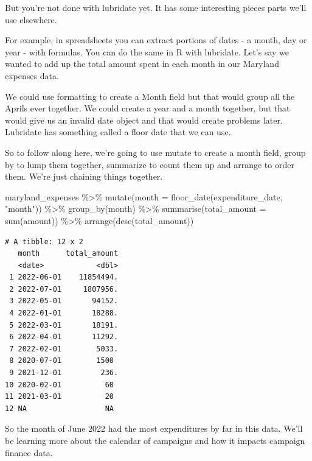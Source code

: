 \documentclass[
  letterpaper,
  DIV=11,
  numbers=noendperiod]{scrreprt}
\newenvironment{Shaded}{\begin{snugshade}}{\end{snugshade}}
\newcommand{\AttributeTok}[1]{\textcolor[rgb]{0.40,0.45,0.13}{#1}}
\newcommand{\FunctionTok}[1]{\textcolor[rgb]{0.28,0.35,0.67}{#1}}
\newcommand{\NormalTok}[1]{\textcolor[rgb]{0.00,0.23,0.31}{#1}}
\newcommand{\SpecialCharTok}[1]{\textcolor[rgb]{0.37,0.37,0.37}{#1}}
\newcommand{\StringTok}[1]{\textcolor[rgb]{0.13,0.47,0.30}{#1}}
\begin{document}
But you're not done with lubridate yet. It has some interesting pieces
parts we'll use elsewhere.

For example, in spreadsheets you can extract portions of dates - a
month, day or year - with formulas. You can do the same in R with
lubridate. Let's say we wanted to add up the total amount spent in each
month in our Maryland expenses data.

We could use formatting to create a Month field but that would group all
the Aprils ever together. We could create a year and a month together,
but that would give us an invalid date object and that would create
problems later. Lubridate has something called a floor date that we can
use.

So to follow along here, we're going to use mutate to create a month
field, group by to lump them together, summarize to count them up and
arrange to order them. We're just chaining things together.

\begin{Shaded}
\begin{Highlighting}[]
\NormalTok{maryland\_expenses }\SpecialCharTok{\%\textgreater{}\%}
  \FunctionTok{mutate}\NormalTok{(}\AttributeTok{month =} \FunctionTok{floor\_date}\NormalTok{(expenditure\_date, }\StringTok{"month"}\NormalTok{)) }\SpecialCharTok{\%\textgreater{}\%}
  \FunctionTok{group\_by}\NormalTok{(month) }\SpecialCharTok{\%\textgreater{}\%}
  \FunctionTok{summarise}\NormalTok{(}\AttributeTok{total\_amount =} \FunctionTok{sum}\NormalTok{(amount)) }\SpecialCharTok{\%\textgreater{}\%}
  \FunctionTok{arrange}\NormalTok{(}\FunctionTok{desc}\NormalTok{(total\_amount))}
\end{Highlighting}
\end{Shaded}

\begin{verbatim}
# A tibble: 12 x 2
   month      total_amount
   <date>            <dbl>
 1 2022-06-01    11854494.
 2 2022-07-01     1807956.
 3 2022-05-01       94152.
 4 2022-01-01       18288.
 5 2022-03-01       18191.
 6 2022-04-01       11292.
 7 2022-02-01        5033.
 8 2020-07-01        1500 
 9 2021-12-01         236.
10 2020-02-01          60 
11 2021-03-01          20 
12 NA                  NA 
\end{verbatim}

So the month of June 2022 had the most expenditures by far in this data.
We'll be learning more about the calendar of campaigns and how it
impacts campaign finance data.

\end{document}
